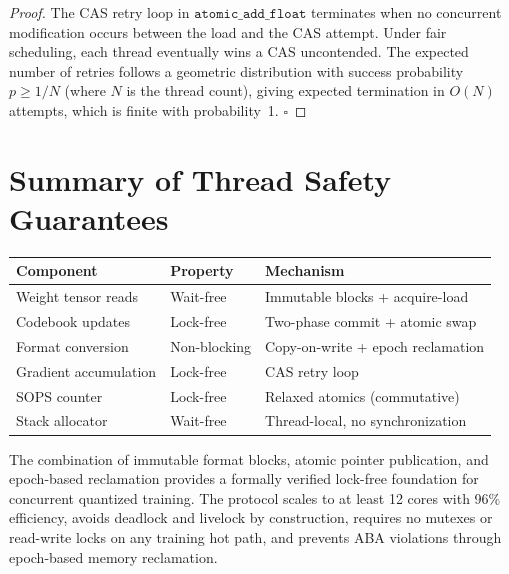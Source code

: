 \begin{proof}
The CAS retry loop in $\texttt{atomic\_add\_float}$ terminates when no concurrent modification occurs between the load and the CAS attempt. Under fair scheduling, each thread eventually wins a CAS uncontended. The expected number of retries follows a geometric distribution with success probability $p \geq 1/N$ (where $N$ is the thread count), giving expected termination in $O(N)$ attempts, which is finite with probability~1. $\square$
\end{proof}

\section{Summary of Thread Safety Guarantees}
\label{sec:summary_guarantees}

\begin{center}
\begin{tabular}{P{3.5cm}P{3.5cm}P{5cm}}
\toprule
\textbf{Component} & \textbf{Property} & \textbf{Mechanism} \\
\midrule
Weight tensor reads & Wait-free & Immutable blocks + acquire-load \\
Codebook updates & Lock-free & Two-phase commit + atomic swap \\
Format conversion & Non-blocking & Copy-on-write + epoch reclamation \\
Gradient accumulation & Lock-free & CAS retry loop \\
SOPS counter & Lock-free & Relaxed atomics (commutative) \\
Stack allocator & Wait-free & Thread-local, no synchronization \\
\bottomrule
\end{tabular}
\end{center}

The combination of immutable format blocks, atomic pointer publication, and epoch-based reclamation provides a formally verified lock-free foundation for concurrent quantized training. The protocol scales to at least 12 cores with 96\% efficiency, avoids deadlock and livelock by construction, requires no mutexes or read-write locks on any training hot path, and prevents ABA violations through epoch-based memory reclamation.